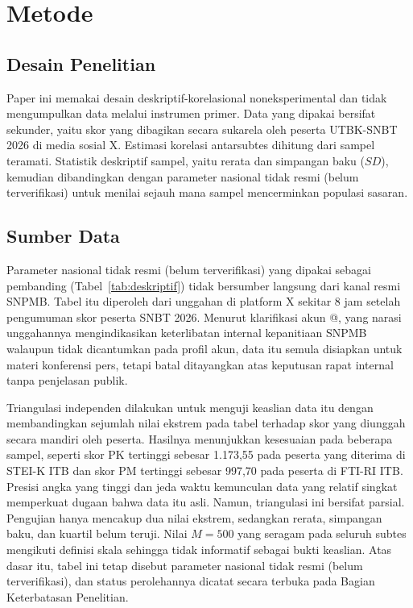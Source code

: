 \section{Metode}

\subsection{Desain Penelitian}
Paper ini memakai desain deskriptif-korelasional noneksperimental dan tidak mengumpulkan data melalui instrumen primer. Data yang dipakai bersifat sekunder, yaitu skor yang dibagikan secara sukarela oleh peserta UTBK-SNBT 2026 di media sosial X. Estimasi korelasi antarsubtes dihitung dari sampel teramati. Statistik deskriptif sampel, yaitu rerata dan simpangan baku ($SD$), kemudian dibandingkan dengan parameter nasional tidak resmi (belum terverifikasi) untuk menilai sejauh mana sampel mencerminkan populasi sasaran.

\subsection{Sumber Data}
Parameter nasional tidak resmi (belum terverifikasi) yang dipakai sebagai pembanding (Tabel~\ref{tab:deskriptif}) tidak bersumber langsung dari kanal resmi SNPMB. Tabel itu diperoleh dari unggahan di platform X sekitar 8 jam setelah pengumuman skor peserta SNBT 2026. Menurut klarifikasi akun @\textcite{kevins2026}, yang narasi unggahannya mengindikasikan keterlibatan internal kepanitiaan SNPMB walaupun tidak dicantumkan pada profil akun, data itu semula disiapkan untuk materi konferensi pers, tetapi batal ditayangkan atas keputusan rapat internal tanpa penjelasan publik.

Triangulasi independen dilakukan untuk menguji keaslian data itu dengan membandingkan sejumlah nilai ekstrem pada tabel terhadap skor yang diunggah secara mandiri oleh peserta. Hasilnya menunjukkan kesesuaian pada beberapa sampel, seperti skor PK tertinggi sebesar 1.173,55 pada peserta yang diterima di STEI-K ITB dan skor PM tertinggi sebesar 997,70 pada peserta di FTI-RI ITB. Presisi angka yang tinggi dan jeda waktu kemunculan data yang relatif singkat memperkuat dugaan bahwa data itu asli. Namun, triangulasi ini bersifat parsial. Pengujian hanya mencakup dua nilai ekstrem, sedangkan rerata, simpangan baku, dan kuartil belum teruji. Nilai $M = 500$ yang seragam pada seluruh subtes mengikuti definisi skala sehingga tidak informatif sebagai bukti keaslian. Atas dasar itu, tabel ini tetap disebut parameter nasional tidak resmi (belum terverifikasi), dan status perolehannya dicatat secara terbuka pada Bagian Keterbatasan Penelitian.

